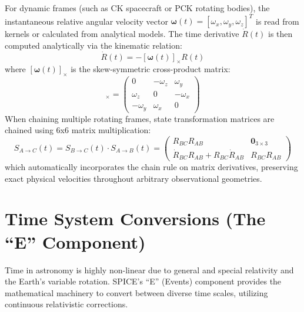 \documentclass{acta}
\begin{document}
For dynamic frames (such as CK spacecraft or PCK rotating bodies), the instantaneous relative angular velocity vector $\boldsymbol{\omega}(t) = [\omega_x, \omega_y, \omega_z]^T$ is read from kernels or calculated from analytical models. The time derivative $\dot{R}(t)$ is then computed analytically via the kinematic relation:
\begin{equation}
\dot{R}(t) = -[\boldsymbol{\omega}(t)]_{\times} R(t)
\end{equation}
where $[\boldsymbol{\omega}(t)]_{\times}$ is the skew-symmetric cross-product matrix:
\begin{equation}
[\boldsymbol{\omega}(t)]_{\times} = \begin{pmatrix} 0 & -\omega_z & \omega_y \\ \omega_z & 0 & -\omega_x \\ -\omega_y & \omega_x & 0 \end{pmatrix}
\end{equation}
When chaining multiple rotating frames, state transformation matrices are chained using 6x6 matrix multiplication:
\begin{equation}
S_{A \to C}(t) = S_{B \to C}(t) \cdot S_{A \to B}(t) = \begin{pmatrix} R_{BC} R_{AB} & \mathbf{0}_{3\times 3} \\ \dot{R}_{BC} R_{AB} + R_{BC} \dot{R}_{AB} & R_{BC} R_{AB} \end{pmatrix}
\end{equation}
which automatically incorporates the chain rule on matrix derivatives, preserving exact physical velocities throughout arbitrary observational geometries.

\section{Time System Conversions (The ``E'' Component)}
Time in astronomy is highly non-linear due to general and special relativity and the Earth's variable rotation. SPICE's ``E'' (Events) component provides the mathematical machinery to convert between diverse time scales, utilizing continuous relativistic corrections.
\end{document}
